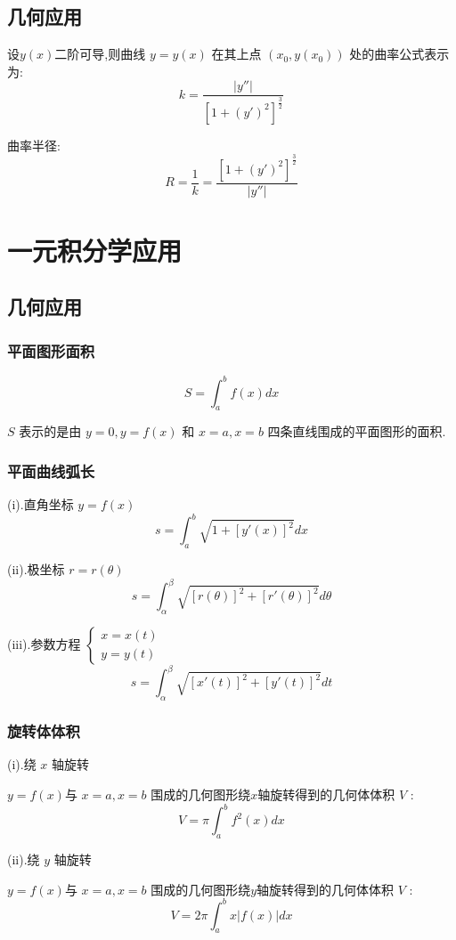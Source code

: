 \subsection{几何应用}
\begin{definition}[曲率和曲率半径]

	设$y(x)$二阶可导,则曲线 $y=y(x)$ 在其上点 $(x_{0},y(x_{0}))$ 处的曲率公式表示为:
	$$k=\frac{|y''|}{[1+(y')^{2}]^{\frac{3}{2}}}$$

	曲率半径:
	$$R=\frac{1}{k}=\frac{[1+(y')^{2}]^{\frac{3}{2}}}{|y''|}$$
\end{definition}
\section{一元积分学应用}
\subsection{几何应用}
\subsubsection{平面图形面积}
\begin{definition}[定积分几何意义]
	$$S=\int_{a}^{b}f(x)dx$$

	$S$ 表示的是由 $y=0,y=f(x)$ 和 $x=a,x=b$ 四条直线围成的平面图形的面积.
\end{definition}
\subsubsection{平面曲线弧长}
\begin{theorem}[平面曲线的弧长]

	(i).直角坐标 $y=f(x)$
	$$s=\int_{a}^{b}\sqrt{1+[y'(x)]^{2}}dx$$

	(ii).极坐标 $r=r(\theta)$
	$$s=\int_{\alpha}^{\beta}\sqrt{[r(\theta)]^{2}+[r'(\theta)]^{2}}d\theta$$

	(iii).参数方程 $\left\lbrace
		\begin{array}{l}
			x=x(t) \\
			y=y(t)
		\end{array}
		\right. $
	$$s=\int_{\alpha}^{\beta}\sqrt{[x'(t)]^{2}+[y'(t)]^{2}}dt$$
\end{theorem}
\subsubsection{旋转体体积}
\begin{theorem}[旋转体体积]

	(i).绕 $x$ 轴旋转

	$y=f(x)$与 $x=a,x=b$ 围成的几何图形绕$x$轴旋转得到的几何体体积 $V$ :
	$$V=\pi\int_{a}^{b}f^{2}(x)dx$$

	(ii).绕 $y$ 轴旋转

	$y=f(x)$与 $x=a,x=b$ 围成的几何图形绕$y$轴旋转得到的几何体体积 $V$ :
	$$V=2\pi\int_{a}^{b}x|f(x)|dx$$
\end{theorem}
